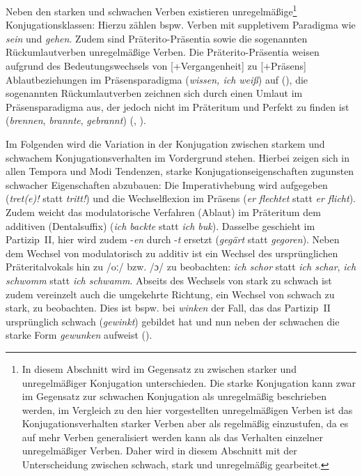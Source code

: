 Neben den starken und schwachen Verben existieren unregelmäßige\footnote{In diesem Abschnitt wird im Gegensatz zu  zwischen starker und unregelmäßiger Konjugation unterschieden. Die starke Konjugation kann zwar im Gegensatz zur schwachen Konjugation als unregelmäßig beschrieben werden, im Vergleich zu den hier vorgestellten unregelmäßigen Verben ist das Konjugationsverhalten starker Verben aber als regelmäßig einzustufen, da es auf mehr Verben generalisiert werden kann als das Verhalten einzelner unregelmäßiger Verben. Daher wird in diesem Abschnitt mit der Unterscheidung zwischen schwach, stark und unregelmäßig gearbeitet.}   Konjugationsklassen: Hierzu zählen bspw. Verben mit suppletivem Paradigma wie \textit{sein} und \textit{gehen}. Zudem sind Präterito-Präsentia sowie die sogenannten Rückumlautverben unregelmäßige Verben. Die Präterito-Präsentia weisen aufgrund des Bedeutungswechsels von [+Vergangenheit] zu [+Präsens] Ablautbeziehungen im Präsensparadigma (\textit{wissen, ich weiß}) auf (\cite[99--101]{Bergmann.2016}), die sogenannten Rückumlautverben zeichnen sich durch einen Umlaut im Präsensparadigma aus, der jedoch nicht im Präteritum und Perfekt zu finden ist (\textit{brennen}, \textit{brannte}, \textit{gebrannt}) (\cite[60--61]{Bittner.1985}, \cite[98--99]{Bergmann.2016}). 

Im Folgenden wird die Variation in der Konjugation zwischen starkem und schwachem Konjugationsverhalten im Vordergrund stehen. Hierbei zeigen sich in allen Tempora und Modi Tendenzen, starke Konjugationseigenschaften zugunsten schwacher Eigenschaften abzubauen: Die Imperativhebung wird aufgegeben (\textit{tret(e)!} statt \textit{tritt!}) und die Wechselflexion im Präsens (\textit{er flechtet} statt \textit{er flicht}). Zudem weicht das modulatorische Verfahren (Ablaut) im Präteritum dem additiven (Dentalsuffix) (\textit{ich backte} statt \textit{ich buk}). Dasselbe geschieht im Partizip~II, hier wird zudem -\textit{en} durch -\textit{t} ersetzt (\textit{gegärt} statt \textit{gegoren}). Neben dem Wechsel von modulatorisch zu additiv ist ein Wechsel des ursprünglichen Präterital\-vokals hin zu /oː/ bzw. /ɔ/ zu beobachten: \textit{ich schor} statt \textit{ich schar}, \textit{ich schwomm} statt \textit{ich schwamm}. Abseits des Wechsels von stark zu schwach ist zudem vereinzelt auch die umgekehrte Richtung, ein Wechsel von schwach zu stark, zu beobachten. Dies ist bspw. bei \textit{winken} der Fall, das das Partizip~II ursprünglich schwach (\textit{gewinkt}) gebildet hat und nun neben der schwachen die starke Form \textit{gewunken} aufweist (\cite{Duden.2020}).

